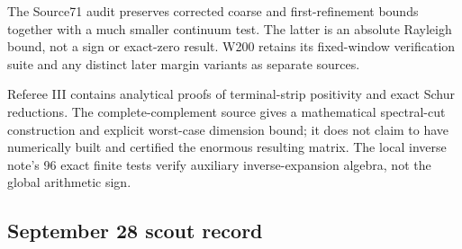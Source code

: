 \documentclass[
  10pt,
  a4paper,
  10pt,
  oneside,
  openany]{book}
\begin{document}
The Source71 audit preserves corrected coarse and first-refinement
bounds together with a much smaller continuum test. The latter is an
absolute Rayleigh bound, not a sign or exact-zero result. W200 retains
its fixed-window verification suite and any distinct later margin
variants as separate sources.

Referee III contains analytical proofs of terminal-strip positivity and
exact Schur reductions. The complete-complement source gives a
mathematical spectral-cut construction and explicit worst-case dimension
bound; it does not claim to have numerically built and certified the
enormous resulting matrix. The local inverse note's 96 exact finite
tests verify auxiliary inverse-expansion algebra, not the global
arithmetic sign.

\subsection{September 28 scout record}\label{september-28-scout-record}
\end{document}
